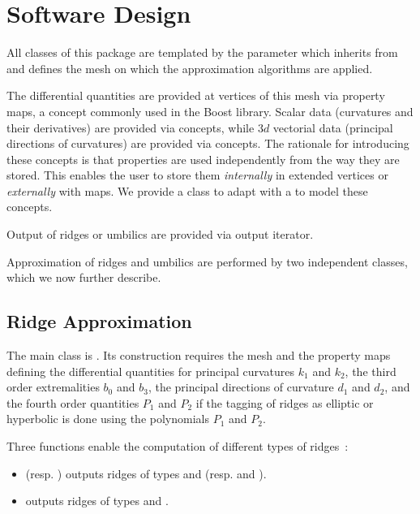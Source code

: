 \section{Software Design}
\label{soft}

All classes of this package are templated by the parameter
 which inherits from 
and defines the mesh on which the approximation algorithms are applied.

The differential quantities are provided at vertices of this mesh via
property maps, a concept commonly used in the Boost library. Scalar
data (curvatures and their derivatives) are provided via
 concepts, while  $3d$ vectorial data (principal
directions of curvatures) are provided via
 concepts. 
The rationale for introducing these concepts is that properties are
used independently from the way they are stored. This enables the user
to store them {\em internally} in extended vertices or {\em externally}
with maps. We provide a class
 to adapt  with 
a  to model these concepts.


Output of ridges or umbilics are provided via output iterator.

Approximation of ridges and umbilics are performed by two independent
classes, which we now further describe.

\subsection{Ridge Approximation}


The main class is
.
Its construction requires the mesh and the property maps defining the
differential quantities for principal curvatures $k_1$ and $k_2$, the
third order extremalities $b_0$ and $b_3$, the principal directions of
curvature $d_1$ and $d_2$, and the fourth order quantities $P_1$ and
$P_2$ if the tagging of ridges as elliptic or hyperbolic is done using
the polynomials $P_1$ and $P_2$.


Three functions enable the computation of different types of ridges~:
\begin{itemize}
\item {} (resp. )
  outputs ridges of types  and
   (resp.  and
  ).
\item {} outputs ridges of types
   and .
\end{itemize}

